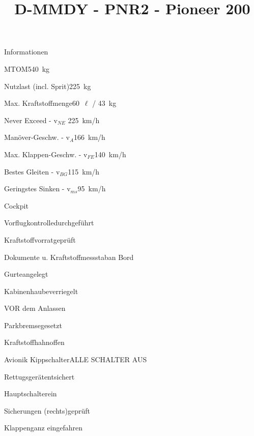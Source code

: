 \def\papersize{4}




\title{D-MMDY  -  PNR2  -  Pioneer 200}

\begin{checklist}{Informationen}
 	\item{MTOM}{540~kg}
  	\item{Nutzlast (incl. Sprit)}{225~kg}
  	\item{Max. Kraftstoffmenge}{60~${\ell}$ / 43~kg}
 	  \item{Never Exceed  -  v$_{NE}$ }{ 225~km/h}
	  \item{Manöver-Geschw.  -  v$_{A}$}{166~km/h}
	  \item{Max. Klappen-Geschw.  -  v$_{FE}$}{140~km/h}
	  \item{Bestes Gleiten  -  v$_{BG}$}{115~km/h}
	  \item{Geringstes Sinken  -  v$_{ms}$}{95~km/h}
\end{checklist}

\begin{checklist}{Cockpit}
	\item{Vorflugkontrolle}{durchgeführt}
	\item{Kraftstoffvorrat}{geprüft}
	\item{Dokumente u. Kraftstoffmessstab}{an Bord}
	\item{Gurte}{angelegt}
	\item{Kabinenhaube}{verriegelt}
\end{checklist}

\begin{checklist}{VOR dem Anlassen}
	\item{Parkbremse}{gesetzt}
	\item{Kraftstoffhahn}{offen}
	\item{Avionik Kippschalter}{ALLE SCHALTER AUS}
	\item{Rettugsgerät}{entsichert}
	\item{Hauptschalter}{ein}
	\item{Sicherungen (rechts)}{geprüft}
	\item{Klappen}{ganz eingefahren}
\end{checklist}

